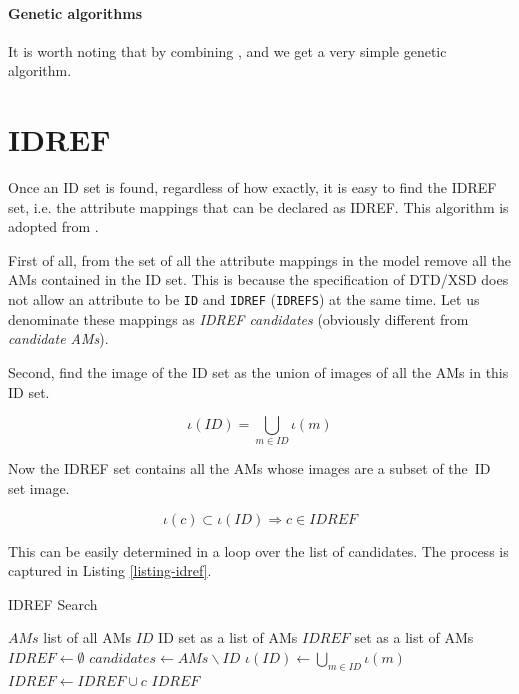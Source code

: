 \paragraph{Genetic algorithms}

It is worth noting that by combining ,  and  we get a very simple genetic algorithm.

\section{IDREF}

Once an ID set is found, regardless of how exactly, it is easy to find the IDREF set, i.e. the attribute mappings that can be declared as IDREF. This algorithm is adopted from \cite{fidax}.

First of all, from the set of all the attribute mappings in the model remove all the AMs contained in the ID set. This is because the specification of DTD/XSD does not allow an attribute to be \texttt{ID} and \texttt{IDREF} (\texttt{IDREFS}) at the same time. Let us denominate these mappings as \textit{IDREF candidates} (obviously different from \textit{candidate AMs}).

Second, find the image of the ID set as the union of images of all the AMs in this ID set.

\[\iota(ID) = \bigcup_{m \in ID} \iota(m)\]

Now the IDREF set contains all the AMs whose images are a subset of the~ID set image.

\[\iota(c) \subset \iota(ID) \Rightarrow c \in IDREF\]

This can be easily determined in a loop over the list of candidates. The process is captured in Listing \ref{listing-idref}.

\begin{algorithm}
\caption{IDREF Search}
\label{listing-idref}
\begin{algorithmic}
\REQUIRE $AMs$ list of all AMs
\REQUIRE $ID$ ID set as a list of AMs
\ENSURE $IDREF$ set as a list of AMs
\STATE $IDREF \gets \emptyset$
\STATE $candidates \gets AMs \backslash ID$
\STATE $\iota(ID) \gets \bigcup_{m \in ID} \iota(m)$
    \STATE $IDREF \gets IDREF \cup c$
  \ENDIF
\ENDFOR
\RETURN $IDREF$
\end{algorithmic}
\end{algorithm}
